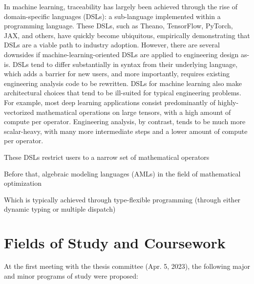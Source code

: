 \documentclass[12pt,vi,oneside]{report}
\begin{document}
    In machine learning, traceability has largely been achieved through the rise of domain-specific languages (DSLs): a sub-language implemented within a programming language. These DSLs, such as Theano, TensorFlow, PyTorch, JAX, and others, have quickly become ubiquitous, empirically demonstrating that DSLs are a viable path to industry adoption. However, there are several downsides if machine-learning-oriented DSLs are applied to engineering design as-is. DSLs tend to differ substantially in syntax from their underlying language, which adds a barrier for new users, and more importantly, requires existing engineering analysis code to be rewritten. DSLs for machine learning also make architectural choices that tend to be ill-suited for typical engineering problems. For example, most deep learning applications consist predominantly of highly-vectorized mathematical operations on large tensors, with a high amount of compute per operator. Engineering analysis, by contrast, tends to be much more scalar-heavy, with many more intermediate steps and a lower amount of compute per operator.


    These DSLs restrict users to a narrow set of mathematical operators

    Before that, algebraic modeling languages (AMLs) in the field of mathematical optimization

    Which is typically achieved through type-flexible programming (through either dynamic typing or multiple dispatch)


    \section{Fields of Study and Coursework}

    At the first meeting with the thesis committee (Apr. 5, 2023), the following major and minor programs of study were proposed:
\end{document}
